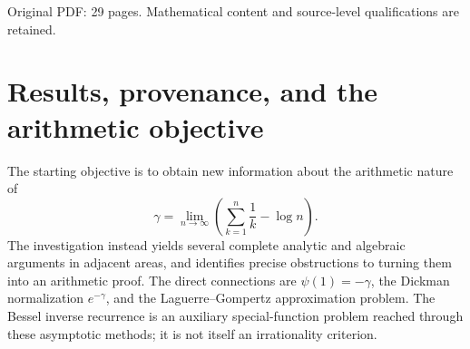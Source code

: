 \documentclass[11pt,a4paper]{article}
\theoremstyle{definition}
\theoremstyle{remark}
\numberwithin{equation}{section}
\begin{document}
Original PDF: 29 pages. Mathematical content and source-level qualifications are retained.


\begin{abstract}
For the signed remainders $R_N$ in Stirling's expansion of $\log\Gamma$,
we prove
\[
 2N+m-2<\deg_{\rm cm}[(-1)^mR_N^{(m)}]<2N+m-1
 \quad(N\ge2,\ m=0,1,2),
\]
and show that the positive fractional excess tends to zero as
$N\to\infty$. A spectral representation and a stability theorem for
small fractional derivatives supply the lower bounds; zero integral
moments force the strict upper bounds. Two boundary families also fail
at every derivative order $m\ge3$. These results refute five real-degree
formula families explicitly conjectured by Mahmoud and Qi (2022).
For Dickman-related questions, we prove divergence of a formal delay
equation solution and construct counterexamples to a conjectured
tilted-density limit, including one with a purely absolutely continuous
L\'evy measure and a proper density. A polynomial intertwiner proves
Atia's (2024) conjectured inverse Bessel recurrence. We also prove a
half-integral Laguerre coefficient statement printed as a conjecture
in a 2007 preprint, explain a factorial-error divergence observation,
and establish restricted Borel-division and lattice-obstruction results.
The source ledger distinguishes these outcomes and their priority
limitations. No irrationality or transcendence proof for Euler's
constant is obtained, and no claim of ten independent, previously open
problems newly solved is made.
\end{abstract}


\section{Results, provenance, and the arithmetic objective}
\label{p8:sec:ledger}
The starting objective is to obtain new information about the arithmetic
nature of
\[
 \gamma=\lim_{n\to\infty}\left(\sum_{k=1}^n\frac1k-\log n\right).
\]
The investigation instead yields several complete analytic and algebraic
arguments in adjacent areas, and identifies precise obstructions to
turning them into an arithmetic proof. The direct connections are
$\psi(1)=-\gamma$, the Dickman normalization $e^{-\gamma}$, and the
Laguerre--Gompertz approximation problem. The Bessel inverse recurrence
is an auxiliary special-function problem reached through these
asymptotic methods; it is not itself an irrationality criterion.
\end{document}
